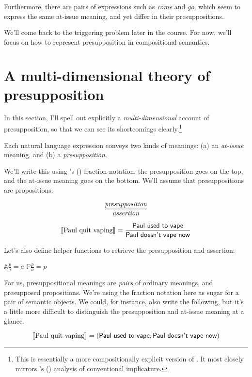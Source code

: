 \documentclass[cronos,landscape,paper=letter]{ling-handout}
\begin{document}
Furthermore, there are pairs of expressions such as \textit{come} and \textit{go}, which seem to express the same at-issue meaning, and yet differ in their presuppositions.

We'll come back to the triggering problem later in the course. For now, we'll focus on how to represent presupposition in compositional semantics.

\section{A multi-dimensional theory of presupposition}

In this section, I'll spell out explicitly a \textit{multi-dimensional} account of presupposition, so that we can see its shortcomings clearly.\footnote{This is essentially a more compositionally explicit version of \citet{karttunenPeters1979}. It most closely mirrors \citeauthor{asudehGiorgolo2012}'s (\citeyear{asudehGiorgolo2012}) analysis of conventional implicature.}

Each natural language expression conveys two kinds of meanings: (a) an \textit{at-issue} meaning, and (b) a \textit{presupposition}.

We'll write this using \citeauthor{sauerland_2008}'s (\citeyear{sauerland_2008}) fraction notation; the presupposition goes on the top, and the at-issue meaning goes on the bottom. We'll assume that presuppositions are propositions.

\[\displaystyle\frac{\text{\it presupposition}}{\text{\it assertion}}\]

\[\eval{Paul quit vaping}= \displaystyle\frac{\ml{Paul used to vape}}{\ml{Paul doesn't vape now}}\]

Let's also define helper functions to retrieve the presupposition and assertion:

\begin{multicols}{2}
\ex
\(𝔸 \displaystyle\frac{p}{a} = a\)
\xe
\columnbreak
\ex
\(ℙ \displaystyle\frac{p}{a} = p\)
\xe
\end{multicols}

For us, presuppositional meanings are \textit{pairs} of ordinary meanings, and presupposed propositions. We're using the fraction notation here as sugar for a pair of semantic objects. We could, for instance, also write the following, but it's a little more difficult to distinguish the presupposition and at-issue meaning at a glance.

\[\eval{Paul quit vaping} = (\ml{Paul used to vape}, \ml{Paul doesn't vape now})\]
\end{document}

